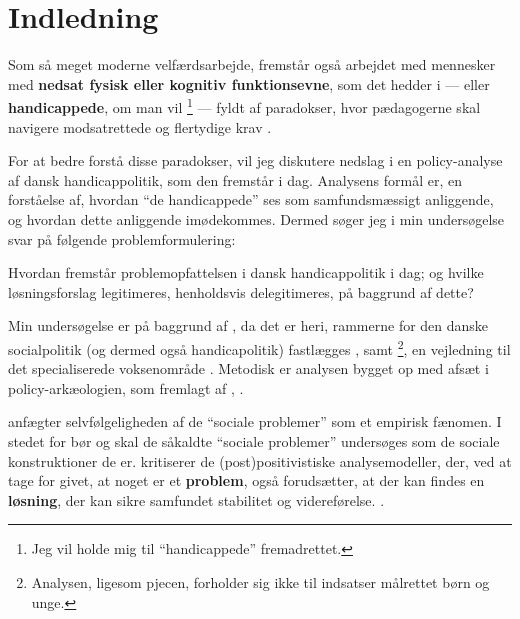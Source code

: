\section{Indledning}

Som så meget moderne velfærdsarbejde, fremstår også arbejdet med mennesker med \textbf{nedsat fysisk eller kognitiv funktionsevne}, som det hedder i  — eller \textbf{handicappede}, om man vil \footnote{Jeg vil holde mig til “handicappede” fremadrettet.} — fyldt af paradokser, hvor pædagogerne skal navigere modsatrettede og flertydige krav \autocite{mik-meyerIndledningSkabeProfessionel2012}.

For at bedre forstå disse paradokser, vil jeg diskutere nedslag i en policy-analyse af dansk handicappolitik, som den fremstår i dag.
Analysens formål er, en forståelse af, hvordan “de handicappede” ses som samfundsmæssigt anliggende, og hvordan dette anliggende imødekommes.
Dermed søger jeg i min undersøgelse svar på følgende problemformulering:

Hvordan fremstår problemopfattelsen i dansk handicappolitik i dag; og hvilke løsningsforslag legitimeres, henholdsvis delegitimeres, på baggrund af dette?

Min undersøgelse er på baggrund af , da det er heri, rammerne for den danske socialpolitik (og dermed også handicapolitik) fastlægges \autocite[kapitel 2]{social-ogindenrigsministerietBekendtgorelseAfLov2019}, samt \footnote{Analysen, ligesom pjecen, forholder sig ikke til indsatser målrettet børn og unge.}, en vejledning til det specialiserede voksenområde \autocite{klStyringAfDet2017}.
Metodisk er analysen bygget op med afsæt i policy-arkæologien, som fremlagt af \citeauthor{scheurichPolicyArchaeologyNew1994}, \citeyear{scheurichPolicyArchaeologyNew1994}.

\citeauthor{scheurichPolicyArchaeologyNew1994} anfægter selvfølgeligheden af de “sociale problemer” som et empirisk fænomen.
I stedet for bør og skal de såkaldte “sociale problemer” undersøges som de sociale konstruktioner de er.
\citeauthor{scheurichPolicyArchaeologyNew1994} kritiserer de (post)positivistiske analysemodeller, der, ved at tage for givet, at noget er et \textbf{problem}, også forudsætter, at der kan findes en \textbf{løsning}, der kan sikre samfundet stabilitet og videreførelse. \autocite[ss. 298-299]{scheurichPolicyArchaeologyNew1994}.

